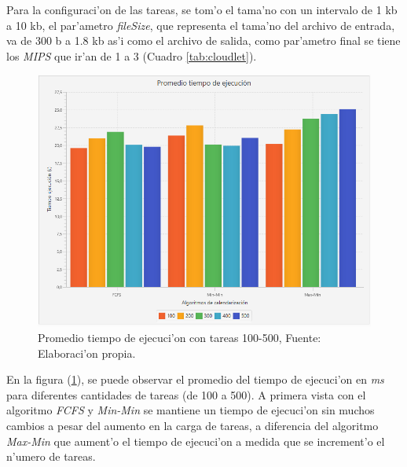 Para la configuraci'on de las tareas, se tom'o el tama'no con un intervalo de 1 kb a 10 kb,  el par'ametro \textit{fileSize}, que representa el tama'no del archivo de entrada, va de 300 b a 1.8 kb as'i como el archivo de salida, como par'ametro final se tiene los \textit{MIPS} que ir'an de 1 a 3 (Cuadro \ref{tab:cloudlet}).



\newpage
\setcounter{figure}{15}
\renewcommand\thefigure{\arabic{figure}}
\begin{figure}[h!] 
	\centering
	\includegraphics[scale=0.5]{media/tiempoejecucion}
	\caption{Promedio tiempo de ejecuci'on con tareas 100-500, Fuente: Elaboraci'on propia.}
	\label{fig:tiempo}
\end{figure}



En la figura (\ref{fig:tiempo}), se puede observar el promedio del tiempo de ejecuci'on en \emph{ms} para diferentes cantidades de tareas (de 100 a 500). A primera vista con el algoritmo \textit{FCFS} y \textit{Min-Min} se mantiene un tiempo de ejecuci'on sin muchos cambios a pesar del aumento en la carga de tareas, a diferencia del algoritmo \textit{Max-Min} que aument'o el tiempo de ejecuci'on a medida que se increment'o el n'umero de tareas.


